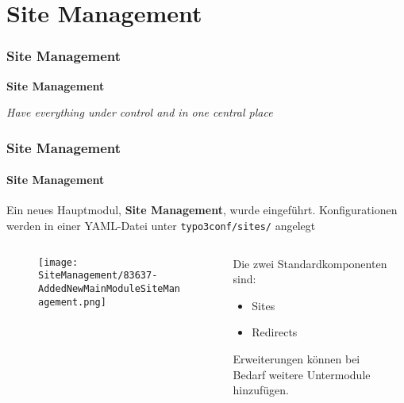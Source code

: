 %

\section{Site Management}
\begin{frame}[fragile]
	\frametitle{Site Management}

	\begin{center}\huge{\color{typo3darkgrey}\textbf{Site Management}}\end{center}
	\begin{center}\large{\textit{Have everything under control and in one central place}}\end{center}

\end{frame}


\begin{frame}[fragile]
	\frametitle{Site Management}
	\framesubtitle{Site Management}

	Ein neues Hauptmodul, \textbf{Site Management}, wurde eingeführt.
	Konfigurationen werden in einer YAML-Datei unter \texttt{typo3conf/sites/} angelegt

	\begin{columns}[T]
		\begin{column}{.4\textwidth}
			\begin{figure}\vspace*{-0.4cm}
				\texttt{[image: SiteManagement/83637-AddedNewMainModuleSiteManagement.png]}
			\end{figure}
		\end{column}
		\begin{column}{.5\textwidth}
			Die zwei Standardkomponenten sind:
			\begin{itemize}
				\item Sites
				\item Redirects
			\end{itemize}
			\vspace{0.4cm}
			Erweiterungen können bei Bedarf weitere Untermodule hinzufügen.
		\end{column}
		\begin{column}{.1\textwidth}
		\end{column}
	\end{columns}

\end{frame}

